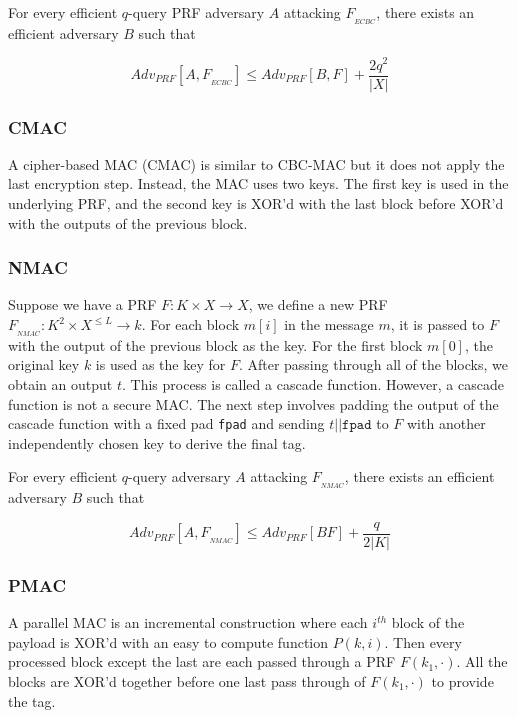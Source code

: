 \documentclass{article}
\begin{document}
\begin{multicols}{2}
For every efficient $q$-query PRF adversary $A$ attacking $F_{_{ECBC}}$, there exists an efficient adversary $B$ such that

$$
Adv_{PRF}[A,F_{_{ECBC}}] \leq Adv_{PRF}[B, F] + \frac{2q^2}{|X|}
$$

\subsubsection{CMAC}

A cipher-based MAC (CMAC) is similar to CBC-MAC but it does not apply the last encryption step. Instead, the MAC uses two keys. The first key is used in the underlying PRF, and the second key is XOR'd with the last block before XOR'd with the outputs of the previous block.

\subsubsection{NMAC}

Suppose we have a PRF $F: K \times X \rightarrow X$, we define a new PRF $F_{_{NMAC}}: K^2 \times X^{\leq L} \rightarrow k$. For each block $m[i]$ in the message $m$, it is passed to $F$ with the output of the previous block as the key. For the first block $m[0]$, the original key $k$ is used as the key for $F$. After passing through all of the blocks, we obtain an output $t$. This process is called a cascade function. However, a cascade function is not a secure MAC. The next step involves padding the output of the cascade function with a fixed pad \texttt{fpad} and sending $t || \mathtt{fpad}$ to $F$ with another independently chosen key to derive the final tag.

For every efficient $q$-query adversary $A$ attacking $F_{_{NMAC}}$, there exists an efficient adversary $B$ such that

$$
Adv_{PRF}[A,F_{_{NMAC}}] \leq Adv_{PRF}[B F] + \frac{q}{2|K|}
$$


\subsubsection{PMAC}

A parallel MAC is an incremental construction where each $i^{th}$ block of the payload is XOR'd with an easy to compute function $P(k,i)$. Then every processed block except the last are each passed through a PRF $F(k_1,\cdot)$. All the blocks are XOR'd together before one last pass through of $F(k_1,\cdot)$ to provide the tag.


\end{multicols}
\end{document}
